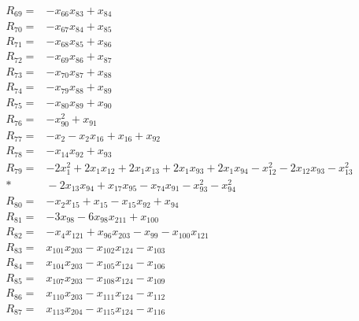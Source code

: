 \documentclass[11pt]{article}
\theoremstyle{remark}\newtheorem{remark}[theorem]{Remark}
\begin{document}
\begin{align*}
R_{69} ={}& -x_{66}x_{83} + x_{84} \\[4pt]
R_{70} ={}& -x_{67}x_{84} + x_{85} \\[4pt]
R_{71} ={}& -x_{68}x_{85} + x_{86} \\[4pt]
R_{72} ={}& -x_{69}x_{86} + x_{87} \\[4pt]
R_{73} ={}& -x_{70}x_{87} + x_{88} \\[4pt]
R_{74} ={}& -x_{79}x_{88} + x_{89} \\[4pt]
R_{75} ={}& -x_{80}x_{89} + x_{90} \\[4pt]
R_{76} ={}& -x_{90}^{2} + x_{91} \\[4pt]
R_{77} ={}& -x_{2} - x_{2}x_{16} + x_{16} + x_{92} \\[4pt]
R_{78} ={}& -x_{14}x_{92} + x_{93} \\[4pt]
R_{79} ={}& -2x_{1}^{2} + 2x_{1}x_{12} + 2x_{1}x_{13} + 2x_{1}x_{93} + 2x_{1}x_{94} - x_{12}^{2} - 2x_{12}x_{93} - x_{13}^{2} \\*
&{} - 2x_{13}x_{94} + x_{17}x_{95} - x_{74}x_{91} - x_{93}^{2} - x_{94}^{2} \\[4pt]
R_{80} ={}& -x_{2}x_{15} + x_{15} - x_{15}x_{92} + x_{94} \\[4pt]
R_{81} ={}& -3x_{98} - 6x_{98}x_{211} + x_{100} \\[4pt]
R_{82} ={}& -x_{4}x_{121} + x_{96}x_{203} - x_{99} - x_{100}x_{121} \\[4pt]
R_{83} ={}& x_{101}x_{203} - x_{102}x_{124} - x_{103} \\[4pt]
R_{84} ={}& x_{104}x_{203} - x_{105}x_{124} - x_{106} \\[4pt]
R_{85} ={}& x_{107}x_{203} - x_{108}x_{124} - x_{109} \\[4pt]
R_{86} ={}& x_{110}x_{203} - x_{111}x_{124} - x_{112} \\[4pt]
R_{87} ={}& x_{113}x_{204} - x_{115}x_{124} - x_{116} \\[4pt]

\end{align*}
\end{document}

